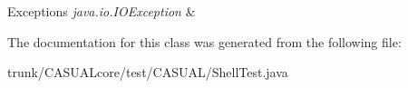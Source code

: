 \begin{DoxyExceptions}{Exceptions}
{\em java.\-io.\-I\-O\-Exception} & \\
\hline
\end{DoxyExceptions}


The documentation for this class was generated from the following file\-:\begin{DoxyCompactItemize}
\item 
trunk/\-C\-A\-S\-U\-A\-Lcore/test/\-C\-A\-S\-U\-A\-L/Shell\-Test.\-java\end{DoxyCompactItemize}
